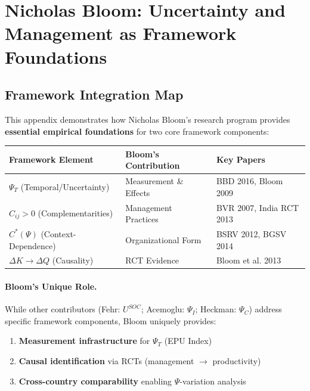 \section{Nicholas Bloom: Uncertainty and Management as Framework Foundations}
\label{app:bloom}

\subsection{Framework Integration Map}

This appendix demonstrates how Nicholas Bloom's research program provides 
\textbf{essential empirical foundations} for two core framework components:

\begin{center}
\renewcommand{\arraystretch}{1.4}
\begin{tabular}{|l|l|l|}
\hline
\textbf{Framework Element} & \textbf{Bloom's Contribution} & \textbf{Key Papers} \\
\hline
$\Psi_T$ (Temporal/Uncertainty) & Measurement \& Effects & BBD 2016, Bloom 2009 \\
$C_{ij} > 0$ (Complementarities) & Management Practices & BVR 2007, India RCT 2013 \\
$C^*(\Psi)$ (Context-Dependence) & Organizational Form & BSRV 2012, BGSV 2014 \\
$\Delta K \to \Delta Q$ (Causality) & RCT Evidence & Bloom et al. 2013 \\
\hline
\end{tabular}
\end{center}

\paragraph{Bloom's Unique Role.}
While other contributors (Fehr: $U^{SOC}$; Acemoglu: $\Psi_I$; Heckman: $\Psi_C$) 
address specific framework components, Bloom uniquely provides:
\begin{enumerate}
    \item \textbf{Measurement infrastructure} for $\Psi_T$ (EPU Index)
    \item \textbf{Causal identification} via RCTs (management $\to$ productivity)
    \item \textbf{Cross-country comparability} enabling $\Psi$-variation analysis
\end{enumerate}

